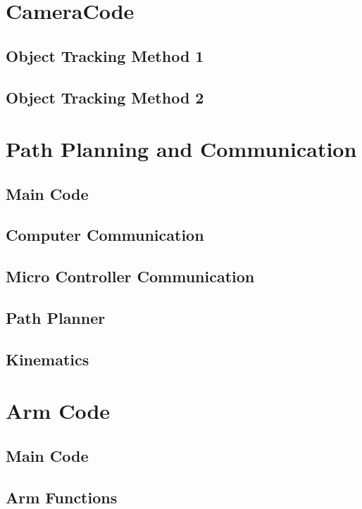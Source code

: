 \appendix

\chapter{CameraCode}\label{chap:sim_code}

\section{Object Tracking Method 1}

\section{Object Tracking Method 2}



\chapter{Path Planning and Communication}\label{chap:nao_code}

\section{Main Code}

\section{Computer Communication}

\section{Micro Controller Communication}

\section{Path Planner}

\section{Kinematics}


\chapter{Arm Code}
\section{Main Code}

\section{Arm Functions}
